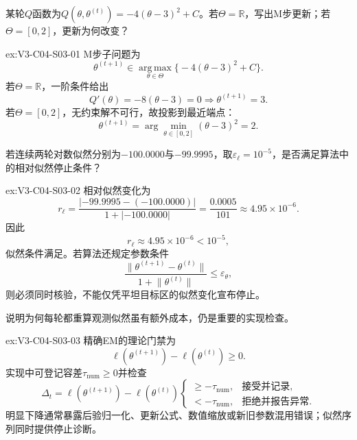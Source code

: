 \begin{SLChapterExercisePairSection}
\begin{exercise}\label{ex:V3-C04-S03-01}
某轮$Q$函数为$Q(\theta,\theta^{(t)})=-4(\theta-3)^2+C$。若$\Theta=\mathbb R$，写出M步更新；若$\Theta=[0,2]$，更新为何改变？
\end{exercise}
\ifSLFullEdition
{}\label{sol:V3-C04-S03-01}
\begin{chapterexercisesolution}{ex:V3-C04-S03-01}
M步子问题为
\[
\theta^{(t+1)}\in\operatorname*{arg\,max}_{\theta\in\Theta}
\bigl\{-4(\theta-3)^2+C\bigr\}.
\]
若$\Theta=\mathbb R$，一阶条件给出
\[
Q'(\theta)=-8(\theta-3)=0
\Longrightarrow \theta^{(t+1)}=3.
\]
若$\Theta=[0,2]$，无约束解不可行，故投影到最近端点：
\[
\theta^{(t+1)}=\arg\min_{\theta\in[0,2]}(\theta-3)^2=2.
\]
\end{chapterexercisesolution}
\fi

\begin{exercise}\label{ex:V3-C04-S03-02}
若连续两轮对数似然分别为$-100.0000$与$-99.9995$，取$\varepsilon_\ell=10^{-5}$，是否满足算法中的相对似然停止条件？
\end{exercise}
\ifSLFullEdition
{}\label{sol:V3-C04-S03-02}
\begin{chapterexercisesolution}{ex:V3-C04-S03-02}
相对似然变化为
\[
r_\ell
=\frac{|{-99.9995}-(-100.0000)|}{1+|-100.0000|}
=\frac{0.0005}{101}
\approx4.95\times10^{-6}.
\]
因此
\[
r_\ell\approx4.95\times10^{-6}<10^{-5},
\]
似然条件满足。若算法还规定参数条件
\[
\frac{\lVert\theta^{(t+1)}-\theta^{(t)}\rVert}{1+\lVert\theta^{(t)}\rVert}
\leq\varepsilon_\theta,
\]
则必须同时核验，不能仅凭平坦目标区的似然变化宣布停止。
\end{chapterexercisesolution}
\fi

\begin{exercise}\label{ex:V3-C04-S03-03}
说明为何每轮都重算观测似然虽有额外成本，仍是重要的实现检查。
\end{exercise}
\ifSLFullEdition
{}\label{sol:V3-C04-S03-03}
\begin{chapterexercisesolution}{ex:V3-C04-S03-03}
精确EM的理论门禁为
\[
\ell(\theta^{(t+1)})-\ell(\theta^{(t)})\geq0.
\]
实现中可登记容差$\tau_{\mathrm{num}}\geq0$并检查
\[
\Delta_t=\ell(\theta^{(t+1)})-\ell(\theta^{(t)})
\begin{cases}
\geq-\tau_{\mathrm{num}},&\text{接受并记录},\\
<-\tau_{\mathrm{num}},&\text{拒绝并报告异常}.
\end{cases}
\]
明显下降通常暴露后验归一化、更新公式、数值缩放或新旧参数混用错误；似然序列同时提供停止诊断。
\end{chapterexercisesolution}
\fi


\end{SLChapterExercisePairSection}
